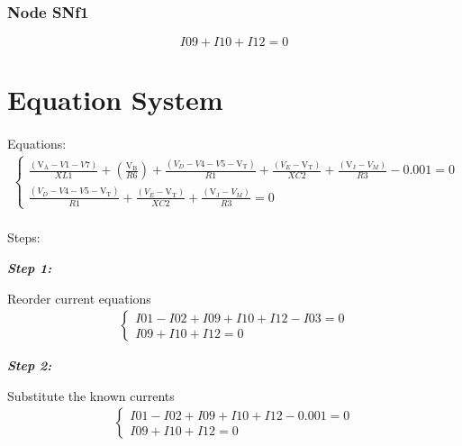 \documentclass[a4paper]{article}
\begin{document}
\subsubsection{Node SNf1}
  \begin{equation}
    I09+I10+I12=0
  \end{equation}

\newpage
\section{Equation System}

\paragraph{} Equations:
\begin{gather*}
\begin{cases}\frac{\left(\mathrm{V_{A}}- V1- V7\right)}{ XL1}+\left(\frac{\mathrm{V_{B}}}{ R6}\right)+\frac{\left( V_{D}- V4- V5-\mathrm{V_{T}}\right)}{ R1}+\frac{\left( V_{E}-\mathrm{V_{T}}\right)}{ XC2}+\frac{\left(\mathrm{V_{J}}- V_{M}\right)}{ R3}-0.001 = 0 \\[0.7em] \frac{\left( V_{D}- V4- V5-\mathrm{V_{T}}\right)}{ R1}+\frac{\left( V_{E}-\mathrm{V_{T}}\right)}{ XC2}+\frac{\left(\mathrm{V_{J}}- V_{M}\right)}{ R3} = 0\end{cases}
\end{gather*}
\par

\paragraph{} Steps:

\begin{small}\textbf{\textit{Step 1:}}\end{small}  Reorder current equations
\begin{gather*}
\begin{cases}I01 - I02 + I09 + I10 + I12 - I03 = 0 \\[0.7em] I09 + I10 + I12 = 0\end{cases}
\end{gather*}

\begin{small}\textbf{\textit{Step 2:}}\end{small}  Substitute the known currents
\begin{gather*}
\begin{cases}I01 - I02 + I09 + I10 + I12 - 0.001 = 0 \\[0.7em] I09 + I10 + I12 = 0\end{cases}
\end{gather*}
\end{document}
